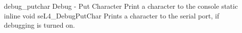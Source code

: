 %
%
%
%

\apidoc
{debug_putchar}
{Debug - Put Character}
{Print a character to the console}
{static inline void seL4\_DebugPutChar}
{
}
{\noret}
{Prints a character to the serial port, if debugging is turned on.}
